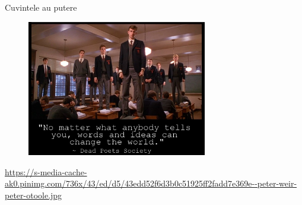 \documentclass{beamer}
\begin{document}
\begin{frame}{Cuvintele au putere}
  \begin{figure}
    \centering
    \includegraphics[width=0.7\textwidth]{img/dead-poets-society-words-change}
  \end{figure}
  \begin{center}
    \tiny
    \url{https://s-media-cache-ak0.pinimg.com/736x/43/ed/d5/43edd52f6d3b0c51925ff2fadd7e369e--peter-weir-peter-otoole.jpg}
  \end{center}
\end{frame}
\end{document}
